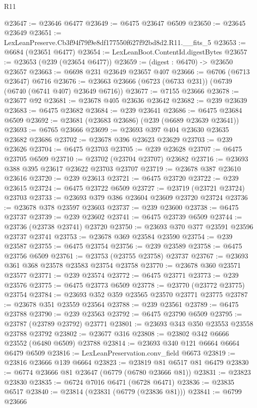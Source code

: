 \begin{lexlean}{R11}
\begin{coremodule}
@23647 := @23646 @6477
@23649 := @6475 @23647 @6509
@23650 := @23645 @23649
@23651 := LexLeanPreserve.Cb3f94f79f9e8df177550f627f92bd8d2.R11.__fits_5
@23653 := @6684 (@23651 @6477)
@23654 := LexLeanBoot.ContentId.digestBytes
@23657 := @23653 (@239 (@23654 @6477))
@23659 := (digest : @6470) -> @23650 @23657
@23663 := @6698 @231 @23649 @23657 @407
@23666 := @6706 (@6713 @23647) @6716
@23676 := @23663 @23666 (@6723 (@6733 @231)) (@6739 (@6740 (@6741 @407) @23649 @6716))
@23677 := @7155 @23666
@23678 := @23677 @92
@23681 := @23678 @405 @23636 @23642
@23682 := @239 @23639
@23683 := @6475 @23682
@23684 := @239 @23641
@23686 := @6475 @23684 @6509
@23692 := @23681 (@23683 @23686) (@239 (@6689 @23639 @23641))
@23693 := @6765 @23666
@23699 := @23693 @397 @404 @23630 @23635 @23682 @23686
@23702 := @23678 @396 @23623 @23629
@23703 := @239 @23626
@23704 := @6475 @23703
@23705 := @239 @23628
@23707 := @6475 @23705 @6509
@23710 := @23702 (@23704 @23707) @23682
@23716 := @23693 @388 @395 @23617 @23622 @23703 @23707
@23719 := @23678 @387 @23610 @23616
@23720 := @239 @23613
@23721 := @6475 @23720
@23722 := @239 @23615
@23724 := @6475 @23722 @6509
@23727 := @23719 (@23721 @23724) @23703
@23733 := @23693 @379 @386 @23604 @23609 @23720 @23724
@23736 := @23678 @378 @23597 @23603
@23737 := @239 @23600
@23738 := @6475 @23737
@23739 := @239 @23602
@23741 := @6475 @23739 @6509
@23744 := @23736 (@23738 @23741) @23720
@23750 := @23693 @370 @377 @23591 @23596 @23737 @23741
@23753 := @23678 @369 @23584 @23590
@23754 := @239 @23587
@23755 := @6475 @23754
@23756 := @239 @23589
@23758 := @6475 @23756 @6509
@23761 := @23753 (@23755 @23758) @23737
@23767 := @23693 @361 @368 @23578 @23583 @23754 @23758
@23770 := @23678 @360 @23571 @23577
@23771 := @239 @23574
@23772 := @6475 @23771
@23773 := @239 @23576
@23775 := @6475 @23773 @6509
@23778 := @23770 (@23772 @23775) @23754
@23784 := @23693 @352 @359 @23565 @23570 @23771 @23775
@23787 := @23678 @351 @23559 @23564
@23788 := @239 @23561
@23789 := @6475 @23788
@23790 := @239 @23563
@23792 := @6475 @23790 @6509
@23795 := @23787 (@23789 @23792) @23771
@23801 := @23693 @343 @350 @23553 @23558 @23788 @23792
@23802 := @23677 @316
@23808 := @23802 @342 @6666 @23552 (@6480 @6509) @23788
@23814 := @23693 @340 @121 @6664 @6664 @6479 @6509
@23816 := LexLeanPreservation.conv_field @6673
@23819 := @23816 @23666 @139 @6664
@23823 := @23819 @81 @6517 @81 @6479
@23830 := @6774 @23666 @81 @23647 (@6779 (@6780 @23666 @81))
@23831 := @23823 @23830
@23835 := @6724 @7016 @6471 (@6728 @6471)
@23836 := @23835 @6517
@23840 := @23814 (@23831 (@6779 (@23836 @81)))
@23841 := @6799 @23666

\end{coremodule}
\end{lexlean}
